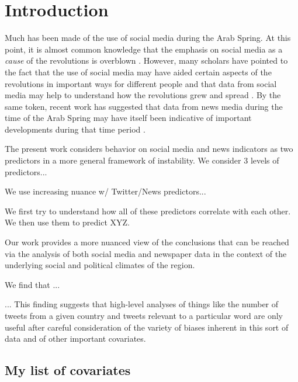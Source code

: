 \section{Introduction}

Much has been made of the use of social media during the Arab Spring. At this point, it is almost common knowledge that the emphasis on social media as a \emph{cause} of the revolutions is overblown \citep{bruns_arab_2013,goldstone_bringing_2013} . However, many scholars have pointed to the fact that the use of social media may have aided certain aspects of the revolutions in important ways for different people  \citep{galle_who_2013,starbird_how_2012,papacharissi_affective_2012} and that data from social media may help to understand how the revolutions grew and spread \citep{lotan_revolutions_2011,bruns_arab_2013}. By the same token, recent work has suggested that data from news media during the time of the Arab Spring may have itself been indicative of important developments during that time period \cite{joseph_arab_2014,pfeffer_rapid_2012}.

The present work considers behavior on social media and news indicators as two predictors in a more general framework of instability. We consider 3 levels of predictors...

We use increasing nuance w/ Twitter/News predictors...

We first try to understand how all of these predictors correlate with each other. We then use them to predict XYZ.  

Our work provides a more nuanced view of the conclusions that can be reached via the analysis of both social media and newspaper data in the context of the underlying social and political climates of the region. 

We find that ...

... This finding suggests that high-level analyses of things like the number of tweets from a given country and tweets relevant to a particular word are only useful after careful consideration of the variety of biases inherent in this sort of data and of other important covariates.

\subsection{My list of covariates}

